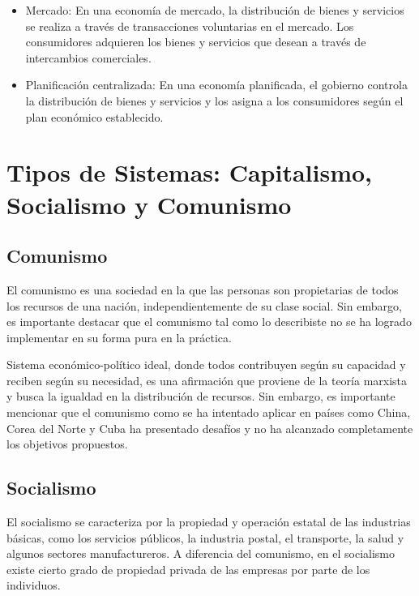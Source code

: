 \documentclass[
  letterpaper,
  DIV=11,
  numbers=noendperiod]{scrartcl}
\begin{document}
\begin{itemize}
\item
  Mercado: En una economía de mercado, la distribución de bienes y
  servicios se realiza a través de transacciones voluntarias en el
  mercado. Los consumidores adquieren los bienes y servicios que desean
  a través de intercambios comerciales.
\item
  Planificación centralizada: En una economía planificada, el gobierno
  controla la distribución de bienes y servicios y los asigna a los
  consumidores según el plan económico establecido.
\end{itemize}

\hypertarget{tipos-de-sistemas-capitalismo-socialismo-y-comunismo}{%
\section{Tipos de Sistemas: Capitalismo, Socialismo y
Comunismo}\label{tipos-de-sistemas-capitalismo-socialismo-y-comunismo}}

\hypertarget{comunismo}{%
\subsection{Comunismo}\label{comunismo}}

El comunismo es una sociedad en la que las personas son propietarias de
todos los recursos de una nación, independientemente de su clase social.
Sin embargo, es importante destacar que el comunismo tal como lo
describiste no se ha logrado implementar en su forma pura en la
práctica.

Sistema económico-político ideal, donde todos contribuyen según su
capacidad y reciben según su necesidad, es una afirmación que proviene
de la teoría marxista y busca la igualdad en la distribución de
recursos. Sin embargo, es importante mencionar que el comunismo como se
ha intentado aplicar en países como China, Corea del Norte y Cuba ha
presentado desafíos y no ha alcanzado completamente los objetivos
propuestos.

\hypertarget{socialismo}{%
\subsection{Socialismo}\label{socialismo}}

El socialismo se caracteriza por la propiedad y operación estatal de las
industrias básicas, como los servicios públicos, la industria postal, el
transporte, la salud y algunos sectores manufactureros. A diferencia del
comunismo, en el socialismo existe cierto grado de propiedad privada de
las empresas por parte de los individuos.
\end{document}

